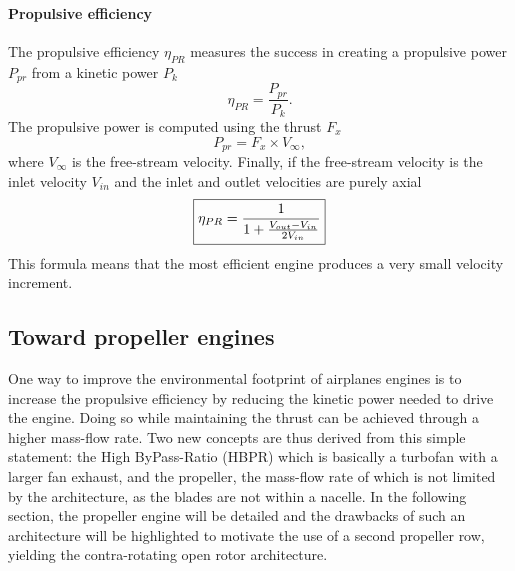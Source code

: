 \paragraph{Propulsive efficiency}
The propulsive efficiency $\eta_{PR}$ measures the success
in creating a propulsive power $P_{pr}$ from a
kinetic power $P_k$
\begin{equation}
	\eta_{PR} = \frac{P_{pr}}{P_k}.
\end{equation}
The propulsive power is computed using the thrust $F_x$
\begin{equation}
	P_{pr} = F_x \times V_{\infty},
\end{equation}
where $V_{\infty}$ is the free-stream velocity.
Finally, if the free-stream velocity is the inlet velocity $V_{in}$
and the inlet and outlet velocities are purely axial
\begin{equation}
	\fbox{$
	\eta_{PR} = \displaystyle \frac{1}{1 + \frac{V_{out} - V_{in}}{2 V_{in}}}
	$}
	\label{eq:cror_propulsive_efficiency}
\end{equation}
This formula means that the most efficient engine produces
a very small velocity increment.

\subsection{Toward propeller engines}
\label{sub:cror_toward_propeller}

One way to improve the environmental footprint of
airplanes engines is to increase the propulsive efficiency
by reducing the kinetic power needed to drive the engine.
Doing so while maintaining the thrust can be achieved through
a higher mass-flow rate. Two new concepts are thus derived from
this simple statement: the High ByPass-Ratio (HBPR) which
is basically a turbofan with a larger fan exhaust, and the
propeller, the mass-flow rate of which is not limited
by the architecture, as the blades are not within a nacelle.
In the following section, the propeller engine will be detailed
and the drawbacks of such an architecture will be highlighted to
motivate the use
of a second propeller row, yielding the contra-rotating open rotor
architecture.


